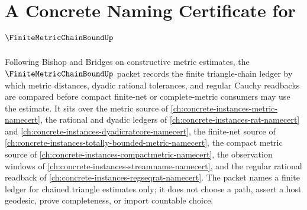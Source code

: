 \chapter{A Concrete Naming Certificate for $\FiniteMetricChainBoundUp$}
\label{ch:concrete-instances-finite-metric-chain-bound-namecert}

Following Bishop and Bridges on constructive metric estimates, the $\FiniteMetricChainBoundUp$ packet records the finite triangle-chain ledger by which metric distances, dyadic rational tolerances, and regular Cauchy readbacks are compared before compact finite-net or complete-metric consumers may use the estimate. It sits over the metric source of \autoref{ch:concrete-instances-metric-namecert}, the rational and dyadic ledgers of \autoref{ch:concrete-instances-rat-namecert} and \autoref{ch:concrete-instances-dyadicratcore-namecert}, the finite-net source of \autoref{ch:concrete-instances-totally-bounded-metric-namecert}, the compact metric source of \autoref{ch:concrete-instances-compactmetric-namecert}, the observation windows of \autoref{ch:concrete-instances-streamname-namecert}, and the regular rational readback of \autoref{ch:concrete-instances-regseqrat-namecert}. The packet names a finite ledger for chained triangle estimates only; it does not choose a path, assert a host geodesic, prove completeness, or import countable choice.

